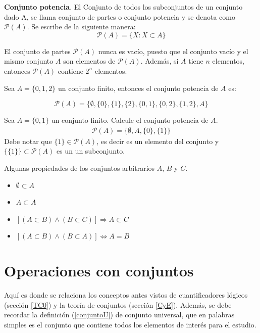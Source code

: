 \begin{mydef}
\textbf{Conjunto potencia}. El Conjunto de todos los subconjuntos de un conjunto dado A, se llama conjunto de partes o conjunto potencia y se denota como $\mathcal{P}(A)$. Se escribe de la siguiente manera:
\begin{equation*}
\mathcal{P}(A)=\{X: X\subset A\}
\end{equation*}
\end{mydef}

El conjunto de partes $\mathcal{P}(A)$ nunca es vacío, puesto que el conjunto vacío y el mismo conjunto $A$ son elementos de $\mathcal{P}(A)$. Además, si $A$ tiene $n$ elementos, entonces $\mathcal{P}(A)$ contiene $2^{n}$ elementos.

\begin{myexample}
Sea $A=\{0,1,2\}$ un conjunto finito, entonces el conjunto potencia de $A$ es:
\end{myexample}
\begin{equation*}
\mathcal{P}(A)=\{\emptyset,\{0\},\{1\},\{2\},\{0,1\},\{0,2\},\{1,2\},A\}
\end{equation*} 

\begin{myexample}
Sea $A=\{0,1\}$ un conjunto finito. Calcule el conjunto potencia de $A$.\\
\begin{eqnarray*}
\mathcal{P}(A)=\{\emptyset,A,\{0\},\{1\}\}
\end{eqnarray*}
Debe notar que $\{1\}\in \mathcal{P}(A)$, es decir es un elemento del conjunto y $\{\{1\}\}\subset \mathcal{P}(A)$ es un un subconjunto.
\end{myexample}
 
Algunas propiedades de los conjuntos arbitrarios $A$, $B$ y $C$.\\
\begin{itemize}
\item  $\emptyset \subset A$
\item  $A\subset A$
\item  $[(A\subset B)\wedge(B\subset C)]\Rightarrow A\subset C$
\item  $[(A\subset B)\wedge(B\subset A)]\Leftrightarrow A=B$
\end{itemize} 

\section{Operaciones con conjuntos}
\label{opc}
Aquí es donde se relaciona los conceptos antes vistos de cuantificadores lógicos (sección \ref{TC0}) y la teoría de conjuntos (sección \ref{CyE}). Además, se debe recordar la definición (\ref{conjuntoU}) de conjunto universal, que en palabras simples es el conjunto que contiene todos los elementos de interés para el estudio.\\

